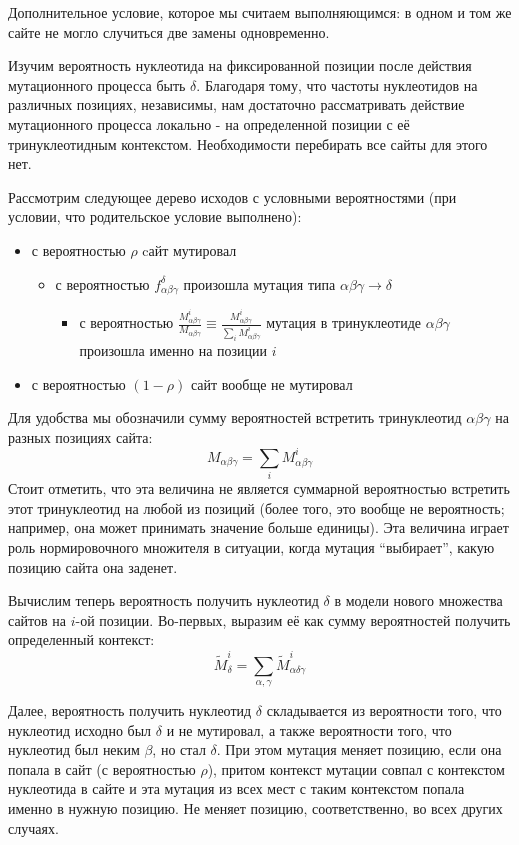 \documentclass[a4paper]{article}
\begin{document}
Дополнительное условие, которое мы считаем выполняющимся: в одном и том же сайте не могло случиться две замены одновременно.

Изучим вероятность нуклеотида на фиксированной позиции после действия мутационного процесса быть $\delta$. Благодаря тому, что частоты нуклеотидов на различных позициях, независимы, нам достаточно рассматривать действие мутационного процесса локально - на определенной позиции с её тринуклеотидным контекстом. Необходимости перебирать все сайты для этого нет.

Рассмотрим следующее дерево исходов с условными вероятностями (при условии, что родительское условие выполнено):
\begin{itemize}
	\item с вероятностью $\rho$ cайт мутировал
	\begin{itemize}
		\item с вероятностью $f_{\alpha\beta\gamma}^{\delta}$ произошла мутация типа $\alpha\beta\gamma\to\delta$
		\begin{itemize}
			\item с вероятностью $\frac{M^i_{\alpha\beta\gamma}}{M_{\alpha\beta\gamma}} \equiv \frac{M^i_{\alpha\beta\gamma}}{\sum_i M^i_{\alpha\beta\gamma}}$ мутация в тринуклеотиде $\alpha\beta\gamma$ произошла именно на позиции $i$
		\end{itemize}
	\end{itemize}
	\item с вероятностью $(1-\rho)$ сайт вообще не мутировал
\end{itemize}

Для удобства мы обозначили сумму вероятностей встретить тринуклеотид $\alpha\beta\gamma$ на разных позициях сайта:
$$M_{\alpha\beta\gamma} = \sum_i M^i_{\alpha\beta\gamma}$$
Стоит отметить, что эта величина не является суммарной вероятностью встретить этот тринуклеотид на любой из позиций (более того, это вообще не вероятность; например, она может принимать значение больше единицы). Эта величина играет роль нормировочного множителя в ситуации, когда мутация ``выбирает'', какую позицию сайта она заденет.

Вычислим теперь вероятность получить нуклеотид $\delta$ в модели нового множества сайтов на $i$-ой позиции. Во-первых, выразим её как сумму вероятностей получить определенный контекст:
$$\widetilde{M}^i_{\delta} = \sum_{\alpha,\gamma}\widetilde{M}^i_{\alpha\delta\gamma}$$

Далее, вероятность получить нуклеотид $\delta$ складывается из вероятности того, что нуклеотид исходно был $\delta$ и не мутировал, а также вероятности того, что нуклеотид был неким $\beta$, но стал $\delta$. При этом мутация меняет позицию, если она попала в сайт (с вероятностью $\rho$), притом контекст мутации совпал с контекстом нуклеотида в сайте и эта мутация из всех мест с таким контекстом попала именно в нужную позицию. Не меняет позицию, соответственно, во всех других случаях.
\end{document}
